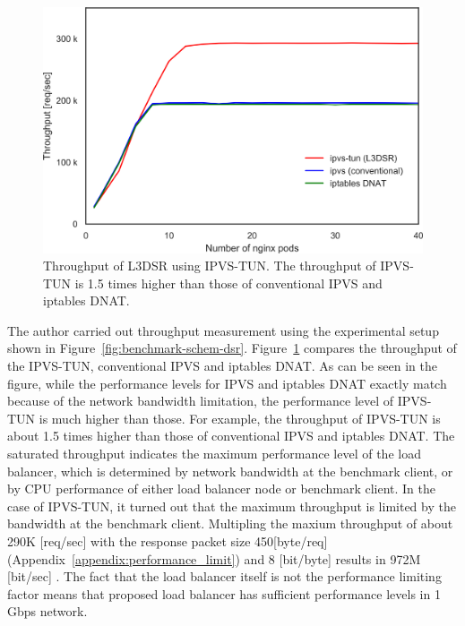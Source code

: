 \begin{figure}[h]
  \centering
  \includegraphics[width=0.75\columnwidth]{Figs/ipvs_l3dsr_1g.png}
  \par\bigskip
  \centering
  \begin{minipage}{0.9\columnwidth}
    \caption[Throughput of L3DSR using IPVS-TUN.]{
      Throughput of L3DSR using IPVS-TUN.
      The throughput of IPVS-TUN is 1.5 times higher than those of conventional IPVS and iptables DNAT.
    }
    \label{fig:ipvs_l3dsr_1g.png}
  \end{minipage}
\end{figure}

The author carried out throughput measurement using the experimental setup shown in Figure~\ref{fig:benchmark-schem-dsr}.
Figure~\ref{fig:ipvs_l3dsr_1g.png} compares the throughput of the IPVS-TUN, conventional IPVS and iptables DNAT.
As can be seen in the figure, while the performance levels for IPVS and iptables DNAT exactly match because of the network bandwidth limitation, the performance level of IPVS-TUN is much higher than those.
For example, the throughput of IPVS-TUN is about 1.5 times higher than those of conventional IPVS and iptables DNAT.
The saturated throughput indicates the maximum performance level of the load balancer, which is determined by network bandwidth at the benchmark client, or by CPU performance of either load balancer node or benchmark client.
In the case of IPVS-TUN, it turned out that the maximum throughput is limited by the bandwidth at the benchmark client.
Multipling the maxium throughput of about 290K [req/sec] with the response packet size 450[byte/req] (Appendix~\ref{appendix:performance_limit}) and 8 [bit/byte] results in 972M [bit/sec] .
The fact that the load balancer itself is not the performance limiting factor means that proposed load balancer has sufficient performance levels in 1 Gbps network.
  


